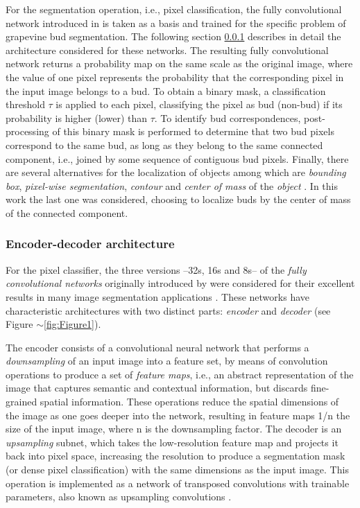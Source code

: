\documentclass[a4paper,authoryear,review]{elsarticle}
\begin{document}
	For the segmentation operation, i.e., pixel classification, the fully convolutional network introduced in \citep{long2015fully} is taken as a basis and trained for the specific problem of grapevine bud segmentation. The following section  \ref{sec:fcnmn} describes in detail the architecture considered for these networks. The resulting fully convolutional network returns a probability map on the same scale as the original image, where the value of one pixel represents the probability that the corresponding pixel in the input image belongs to a bud. To obtain a binary mask, a classification threshold $\tau$ is applied to each pixel, classifying the pixel as bud (non-bud) if its probability is higher (lower) than $\tau$. To identify bud correspondences, post-processing of this binary mask is performed to determine that two bud pixels correspond to the same bud, as long as they belong to the same connected component, i.e., joined by some sequence of contiguous bud pixels. 
	Finally, there are several alternatives for the localization of objects among which are \emph{bounding box}, \emph{pixel-wise segmentation}, \emph{contour} and \emph{center of mass} of the \emph{object} \citep{lampert2008beyond}. In this work the last one was considered, choosing to localize buds by the center of mass of the connected component. 
	
	\subsubsection {Encoder-decoder architecture}
	\label{sec:fcnmn}
	
	For the pixel classifier, the three versions --32s, 16s and 8s--  of the \emph{fully convolutional networks} originally introduced by \citet{long2015fully} were considered for their excellent results in many image segmentation applications \citep{litjens2017survey, garcia2018survey, kaymak2019brief}. These networks have characteristic architectures with two distinct parts: \emph{encoder} and \emph{decoder} (see Figure $\sim$\ref{fig:Figure1}). 
	
	The encoder consists of a convolutional neural network that performs a \emph{downsampling} of an input image into a feature set, by means of convolution operations to produce a set of \emph{feature maps}, i.e., an abstract representation of the image that captures semantic and contextual information, but discards fine-grained spatial information. These operations reduce the spatial dimensions of the image as one goes deeper into the network, resulting in feature maps 1/n the size of the input image, where n is the downsampling factor. The decoder is an \emph{upsampling} subnet, which takes the low-resolution feature map and projects it back into pixel space, increasing the resolution to produce a segmentation mask (or dense pixel classification) with the same dimensions as the input image. This operation is implemented as a network of transposed convolutions with trainable parameters, also known as upsampling convolutions \citep{shelhamer2017fully}. 
	
\end{document}
